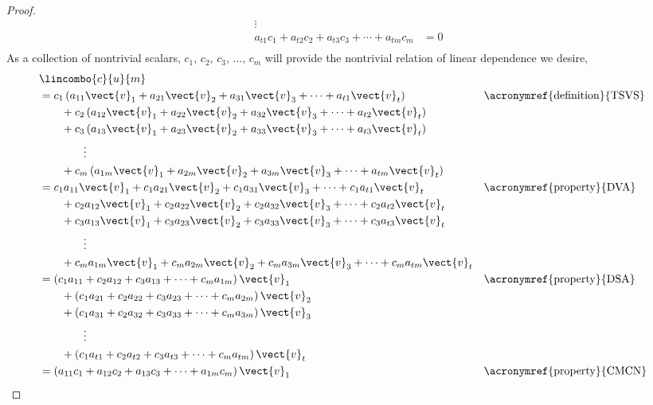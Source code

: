 \begin{proof}
\begin{align*}
\vdots\quad\quad&\\
a_{t1}c_1+a_{t2}c_2+a_{t3}c_3+\cdots+a_{tm}c_m&=0\\
\end{align*}
%
As a collection of nontrivial scalars, $c_1,\,c_2,\,c_3,\,\dots,\,c_m$ will provide the nontrivial relation of linear dependence we desire,
%
\begin{align*}
&\lincombo{c}{u}{m}\\
%
&=c_{1}\left(a_{11}\vect{v}_1+a_{21}\vect{v}_2+a_{31}\vect{v}_3+\cdots+a_{t1}\vect{v}_t\right)
&&\text{\acronymref{definition}{TSVS}}\\
&\quad\quad+c_{2}\left(a_{12}\vect{v}_1+a_{22}\vect{v}_2+a_{32}\vect{v}_3+\cdots+a_{t2}\vect{v}_t\right)\\
&\quad\quad+c_{3}\left(a_{13}\vect{v}_1+a_{23}\vect{v}_2+a_{33}\vect{v}_3+\cdots+a_{t3}\vect{v}_t\right)\\
&\quad\quad\quad\quad\vdots\\
&\quad\quad+c_{m}\left(a_{1m}\vect{v}_1+a_{2m}\vect{v}_2+a_{3m}\vect{v}_3+\cdots+a_{tm}\vect{v}_t\right)\\
%
&=c_{1}a_{11}\vect{v}_1+c_{1}a_{21}\vect{v}_2+c_{1}a_{31}\vect{v}_3+\cdots+c_{1}a_{t1}\vect{v}_t
&&\text{\acronymref{property}{DVA}}\\
&\quad\quad+c_{2}a_{12}\vect{v}_1+c_{2}a_{22}\vect{v}_2+c_{2}a_{32}\vect{v}_3+\cdots+c_{2}a_{t2}\vect{v}_t\\
&\quad\quad+c_{3}a_{13}\vect{v}_1+c_{3}a_{23}\vect{v}_2+c_{3}a_{33}\vect{v}_3+\cdots+c_{3}a_{t3}\vect{v}_t\\
&\quad\quad\quad\quad\vdots\\
&\quad\quad+c_{m}a_{1m}\vect{v}_1+c_{m}a_{2m}\vect{v}_2+c_{m}a_{3m}\vect{v}_3+\cdots+c_{m}a_{tm}\vect{v}_t\\
%
&=\left(c_{1}a_{11}+c_{2}a_{12}+c_{3}a_{13}+\cdots+c_{m}a_{1m}\right)\vect{v}_1
&&\text{\acronymref{property}{DSA}}\\
&\quad\quad+\left(c_{1}a_{21}+c_{2}a_{22}+c_{3}a_{23}+\cdots+c_{m}a_{2m}\right)\vect{v}_2\\
&\quad\quad+\left(c_{1}a_{31}+c_{2}a_{32}+c_{3}a_{33}+\cdots+c_{m}a_{3m}\right)\vect{v}_3\\
&\quad\quad\quad\quad\vdots\\
&\quad\quad+\left(c_{1}a_{t1}+c_{2}a_{t2}+c_{3}a_{t3}+\cdots+c_{m}a_{tm}\right)\vect{v}_t\\
%
&=\left(a_{11}c_{1}+a_{12}c_{2}+a_{13}c_{3}+\cdots+a_{1m}c_{m}\right)\vect{v}_1
&&\text{\acronymref{property}{CMCN}}\\

\end{align*}
\end{proof}
